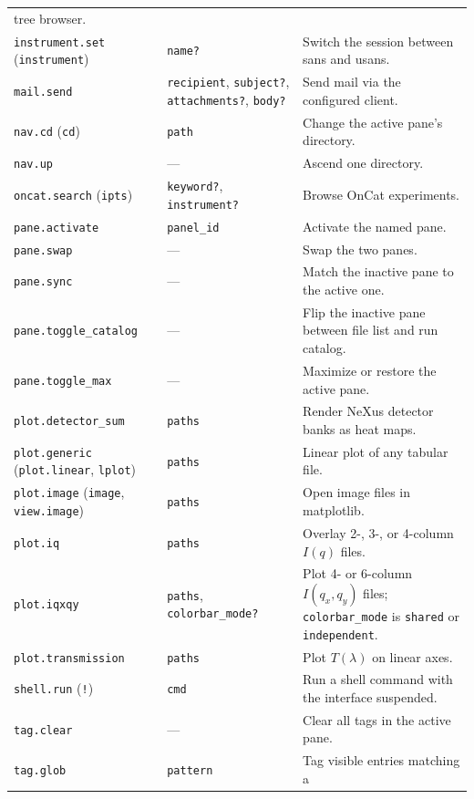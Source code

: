 \documentclass[tm]{ornltm}
\begin{document}
\begin{small}
\begin{longtable}{p{} p{} p{}}
    tree browser. \\
  \texttt{instrument.set} (\texttt{instrument}) & \texttt{name?} & Switch the
    session between \ac{sans} and \ac{usans}. \\
  \texttt{mail.send} & \texttt{recipient}, \texttt{subject?},
    \texttt{attachments?}, \texttt{body?} & Send mail via the configured
    client. \\
  \texttt{nav.cd} (\texttt{cd}) & \texttt{path} & Change the active pane's
    directory. \\
  \texttt{nav.up} & --- & Ascend one directory. \\
  \texttt{oncat.search} (\texttt{ipts}) & \texttt{keyword?},
    \texttt{instrument?} & Browse OnCat experiments. \\
  \texttt{pane.activate} & \texttt{panel\_id} & Activate the named pane. \\
  \texttt{pane.swap} & --- & Swap the two panes. \\
  \texttt{pane.sync} & --- & Match the inactive pane to the active one. \\
  \texttt{pane.toggle\_catalog} & --- & Flip the inactive pane between file list
    and run catalog. \\
  \texttt{pane.toggle\_max} & --- & Maximize or restore the active pane. \\
  \texttt{plot.detector\_sum} & \texttt{paths} & Render NeXus detector banks as
    heat maps. \\
  \texttt{plot.generic} (\texttt{plot.linear}, \texttt{lplot}) &
    \texttt{paths} & Linear plot of any tabular file. \\
  \texttt{plot.image} (\texttt{image}, \texttt{view.image}) & \texttt{paths} &
    Open image files in matplotlib. \\
  \texttt{plot.iq} & \texttt{paths} & Overlay 2-, 3-, or 4-column $I(q)$
    files. \\
  \texttt{plot.iqxqy} & \texttt{paths}, \texttt{colorbar\_mode?} & Plot 4-
    or 6-column $I(q_x,q_y)$ files; \texttt{colorbar\_mode} is \texttt{shared}
    or \texttt{independent}. \\
  \texttt{plot.transmission} & \texttt{paths} & Plot $T(\lambda)$ on linear
    axes. \\
  \texttt{shell.run} (\texttt{!}) & \texttt{cmd} & Run a shell command with the
    interface suspended. \\
  \texttt{tag.clear} & --- & Clear all tags in the active pane. \\
  \texttt{tag.glob} & \texttt{pattern} & Tag visible entries matching a

\end{longtable}
\end{small}
\end{document}
